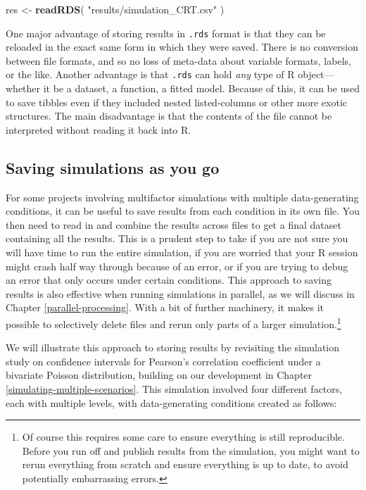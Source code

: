 \documentclass[
]{book}
\newenvironment{Shaded}{\begin{snugshade}}{\end{snugshade}}
\newcommand{\FunctionTok}[1]{\textcolor[rgb]{0.13,0.29,0.53}{\textbf{#1}}}
\newcommand{\NormalTok}[1]{#1}
\newcommand{\OtherTok}[1]{\textcolor[rgb]{0.56,0.35,0.01}{#1}}
\newcommand{\StringTok}[1]{\textcolor[rgb]{0.31,0.60,0.02}{#1}}
\begin{document}
\begin{Shaded}
\begin{Highlighting}[]
\NormalTok{res }\OtherTok{\textless{}{-}} \FunctionTok{readRDS}\NormalTok{( }\StringTok{"results/simulation\_CRT.csv"}\NormalTok{ )}
\end{Highlighting}
\end{Shaded}

One major advantage of storing results in \texttt{.rds} format is that they can be reloaded in the exact same form in which they were saved. There is no conversion between file formats, and so no loss of meta-data about variable formats, labels, or the like.
Another advantage is that \texttt{.rds} can hold \emph{any} type of R object---whether it be a dataset, a function, a fitted model.
Because of this, it can be used to save tibbles even if they included nested listed-columns or other more exotic structures.
The main disadvantage is that the contents of the file cannot be interpreted without reading it back into R.

\subsection{Saving simulations as you go}\label{saving-simulations-as-you-go}

For some projects involving multifactor simulations with multiple data-generating conditions, it can be useful to save results from each condition in its own file.
You then need to read in and combine the results across files to get a final dataset containing all the results.
This is a prudent step to take if you are not sure you will have time to run the entire simulation, if you are worried that your R session might crash half way through because of an error, or if you are trying to debug an error that only occurs under certain conditions.
This approach to saving results is also effective when running simulations in parallel, as we will discuss in Chapter \ref{parallel-processing}.
With a bit of further machinery, it makes it possible to selectively delete files and rerun only parts of a larger simulation.\footnote{Of course this requires some care to ensure everything is still reproducible. Before you run off and publish results from the simulation, you might want to rerun everything from scratch and ensure everything is up to date, to avoid potentially embarrassing errors.}

We will illustrate this approach to storing results by revisiting the simulation study on confidence intervals for Pearson's correlation coefficient under a bivariate Poisson distribution, building on our development in Chapter \ref{simulating-multiple-scenarios}.
This simulation involved four different factors, each with multiple levels, with data-generating conditions created as follows:
\end{document}
